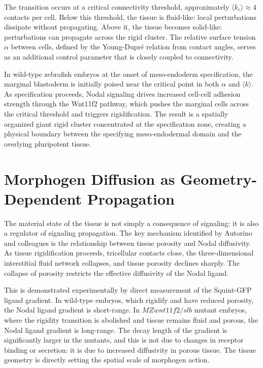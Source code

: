 \documentclass[12pt, a4paper, openany]{book}
\theoremstyle{definition}
\theoremstyle{remark}
\begin{document}
The transition occurs at a critical connectivity threshold, approximately $\langle k_c \rangle \approx 4$ contacts per cell. Below this threshold, the tissue is fluid-like: local perturbations dissipate without propagating. Above it, the tissue becomes solid-like: perturbations can propagate across the rigid cluster. The relative surface tension $\alpha$ between cells, defined by the Young-Dupré relation from contact angles, serves as an additional control parameter that is closely coupled to connectivity.

In wild-type zebrafish embryos at the onset of meso-endoderm specification, the marginal blastoderm is initially poised near the critical point in both $\alpha$ and $\langle k \rangle$. As specification proceeds, Nodal signaling drives increased cell-cell adhesion strength through the Wnt11f2 pathway, which pushes the marginal cells across the critical threshold and triggers rigidification. The result is a spatially organized giant rigid cluster concentrated at the specification zone, creating a physical boundary between the specifying meso-endodermal domain and the overlying pluripotent tissue.

\section{Morphogen Diffusion as Geometry-Dependent Propagation}

The material state of the tissue is not simply a consequence of signaling: it is also a regulator of signaling propagation. The key mechanism identified by Autorino and colleagues is the relationship between tissue porosity and Nodal diffusivity. As tissue rigidification proceeds, tricellular contacts close, the three-dimensional interstitial fluid network collapses, and tissue porosity declines sharply. The collapse of porosity restricts the effective diffusivity of the Nodal ligand.

This is demonstrated experimentally by direct measurement of the Squint-GFP ligand gradient. In wild-type embryos, which rigidify and have reduced porosity, the Nodal ligand gradient is short-range. In $MZwnt11f2/slb$ mutant embryos, where the rigidity transition is abolished and tissue remains fluid and porous, the Nodal ligand gradient is long-range. The decay length of the gradient is significantly larger in the mutants, and this is not due to changes in receptor binding or secretion: it is due to increased diffusivity in porous tissue. The tissue geometry is directly setting the spatial scale of morphogen action.
\end{document}
